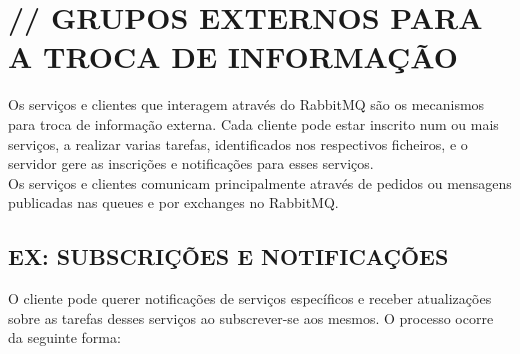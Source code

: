 \documentclass[12pt]{article}
\begin{document}
\section{// GRUPOS EXTERNOS PARA A TROCA DE INFORMAÇÃO}
Os serviços e clientes que interagem através do RabbitMQ são os mecanismos para troca de informação externa. Cada cliente pode estar inscrito num ou mais serviços, a realizar varias tarefas, identificados nos respectivos ficheiros, e o servidor gere as inscrições e notificações para esses serviços.\\

\noindent Os serviços e clientes comunicam principalmente através de pedidos ou mensagens publicadas nas queues e por exchanges no RabbitMQ.

\subsection{EX: SUBSCRIÇÕES E NOTIFICAÇÕES}
O cliente pode querer notificações de serviços específicos e receber atualizações sobre as tarefas desses serviços ao subscrever-se aos mesmos. O processo ocorre da seguinte forma:
\end{document}
